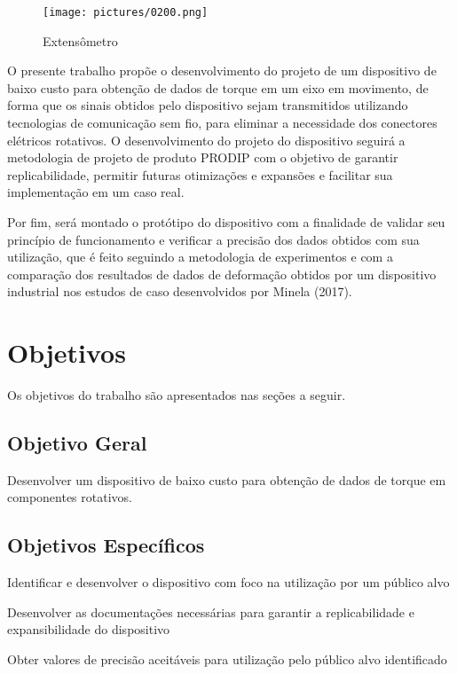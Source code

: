 \begin{figure}[H]
	\caption{\label{fig:0200} Extensômetro}
	\begin{center}
		\texttt{[image: pictures/0200.png]}
	\end{center}
\end{figure}

O presente trabalho propõe o desenvolvimento do projeto de um dispositivo de baixo custo para obtenção de dados de torque em um eixo em movimento, de forma que os sinais obtidos pelo dispositivo
sejam transmitidos utilizando tecnologias de comunicação sem fio, para eliminar a necessidade dos conectores elétricos rotativos.
O desenvolvimento do projeto do dispositivo seguirá a metodologia de projeto de produto PRODIP com o objetivo de garantir replicabilidade, permitir futuras otimizações e expansões e facilitar sua
implementação em um caso real.

Por fim, será montado o protótipo do dispositivo com a finalidade de validar seu princípio de funcionamento e verificar a precisão dos dados obtidos com sua utilização, que é feito seguindo a
metodologia de experimentos e com a comparação dos resultados de dados de deformação obtidos por um dispositivo industrial nos estudos de caso desenvolvidos por Minela (2017).

\section{Objetivos}

Os objetivos do trabalho são apresentados nas seções a seguir.

\subsection{Objetivo Geral}

Desenvolver um dispositivo de baixo custo para obtenção de dados de torque em componentes rotativos.

\subsection{Objetivos Específicos}

Identificar e desenvolver o dispositivo com foco na utilização por um público alvo

Desenvolver as documentações necessárias para garantir a replicabilidade e expansibilidade do dispositivo


Obter valores de precisão aceitáveis para utilização pelo público alvo identificado


